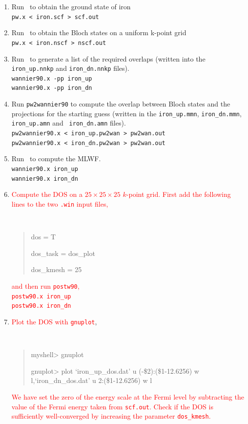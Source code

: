 \documentclass[a4paper,11pt,twoside]{article}
\def\tent#1{\textcolor{red}{#1}}     %
\begin{document}
\begin{enumerate}
\item Run \pwscf\ to obtain the ground state of iron\\
{\tt pw.x < iron.scf > scf.out}

\item Run \pwscf\ to obtain the Bloch states on a uniform k-point grid\\
{\tt pw.x < iron.nscf > nscf.out}

\item Run \wannier\ to generate a list of the required overlaps (written
  into the {\tt iron\_up.nnkp} and {\tt iron\_dn.nnkp} files).\\
{\tt wannier90.x -pp iron\_up}\\
{\tt wannier90.x -pp iron\_dn}

\item Run {\tt pw2wannier90} to compute the overlap between Bloch
  states and the projections for the starting guess (written in the
  {\tt iron\_up.mmn}, {\tt iron\_dn.mmn}, {\tt iron\_up.amn} and {\tt
  iron\_dn.amn} files).\\ 
{\tt pw2wannier90.x < iron\_up.pw2wan > pw2wan.out}\\
{\tt pw2wannier90.x < iron\_dn.pw2wan > pw2wan.out}

\item Run \wannier\ to compute the MLWF.\\
{\tt wannier90.x iron\_up}\\
{\tt wannier90.x iron\_dn}

\item \tent{Compute the DOS on a $25\times 25 \times 25$ $k$-point grid. First add the following
lines to the two {\tt .win} input files,}
{\tt
\begin{quote}
dos = T

dos\_task = dos\_plot

dos\_kmesh = 25
\end{quote}
}

\tent{and then run {\tt postw90},\\
{\tt postw90.x iron\_up}\\
{\tt postw90.x iron\_dn}
}

\item \tent{Plot the DOS with {\tt gnuplot}},
%
{\tt
\begin{quote}
myshell> gnuplot

gnuplot> plot `iron\_up\_dos.dat' u (-\$2):(\$1-12.6256) w l,`iron\_dn\_dos.dat' u 2:(\$1-12.6256) w l

\end{quote} 
}

\tent{We have set the zero of the energy scale at the Fermi level by
  subtracting %
  the value of the Fermi energy taken from {\tt scf.out}.  Check if
  the DOS is sufficiently well-converged by increasing the parameter
  {\tt dos\_kmesh}.  }

\end{enumerate}
\end{document}
